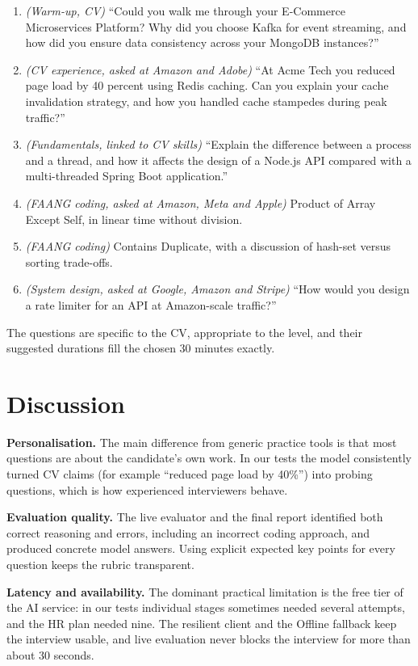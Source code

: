 \documentclass[12pt,a4paper,oneside]{report}
\begin{document}
\begin{enumerate}
  \item \emph{(Warm-up, CV)} ``Could you walk me through your E-Commerce Microservices Platform? Why did you choose Kafka for event streaming, and how did you ensure data consistency across your MongoDB instances?''
  \item \emph{(CV experience, asked at Amazon and Adobe)} ``At Acme Tech you reduced page load by 40 percent using Redis caching. Can you explain your cache invalidation strategy, and how you handled cache stampedes during peak traffic?''
  \item \emph{(Fundamentals, linked to CV skills)} ``Explain the difference between a process and a thread, and how it affects the design of a Node.js API compared with a multi-threaded Spring Boot application.''
  \item \emph{(FAANG coding, asked at Amazon, Meta and Apple)} Product of Array Except Self, in linear time without division.
  \item \emph{(FAANG coding)} Contains Duplicate, with a discussion of hash-set versus sorting trade-offs.
  \item \emph{(System design, asked at Google, Amazon and Stripe)} ``How would you design a rate limiter for an API at Amazon-scale traffic?''
\end{enumerate}

The questions are specific to the CV, appropriate to the level, and their suggested durations fill the chosen 30 minutes exactly.

\section{Discussion}
\textbf{Personalisation.} The main difference from generic practice tools is that most questions are about the candidate's own work. In our tests the model consistently turned CV claims (for example ``reduced page load by 40\%'') into probing questions, which is how experienced interviewers behave.

\textbf{Evaluation quality.} The live evaluator and the final report identified both correct reasoning and errors, including an incorrect coding approach, and produced concrete model answers. Using explicit expected key points for every question keeps the rubric transparent.

\textbf{Latency and availability.} The dominant practical limitation is the free tier of the AI service: in our tests individual stages sometimes needed several attempts, and the HR plan needed nine. The resilient client and the Offline fallback keep the interview usable, and live evaluation never blocks the interview for more than about 30 seconds.
\end{document}
